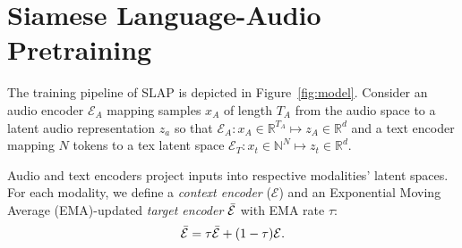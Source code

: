 \documentclass{article}
\begin{document}
\section{Siamese Language-Audio Pretraining}




The training pipeline of SLAP is depicted in Figure~\ref{fig:model}. Consider an audio encoder $\mathcal{E}_A$ mapping samples $x_A$ of length $T_A$ from the audio space to a latent audio representation $z_a$  so that $\mathcal{E}_A : x_A \in \mathbb{R}^{T_A} \mapsto z_A \in \mathbb{R}^d$ and a text encoder mapping $N$ tokens to a tex latent space $\mathcal{E}_T : x_t \in \mathbb{N}^{N} \mapsto z_t \in \mathbb{R}^d$.

Audio and text encoders project inputs into respective modalities' latent spaces. For each modality, we
define a %
\emph{context encoder} ($\mathcal{E}$) and an Exponential Moving Average (EMA)-updated \emph{target encoder} $\Bar{\mathcal{E}}$ with EMA rate $\tau$:
\begin{equation}
    \Bar{\mathcal{E}} = \tau \Bar{\mathcal{E}} + (1-\tau) \mathcal{E}.
\end{equation}
\end{document}
